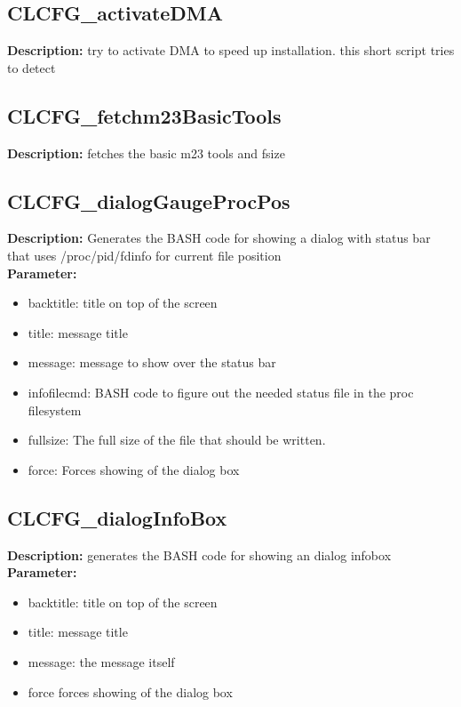 \subsection{CLCFG\_activateDMA}
\textbf{Description:} try to activate DMA to speed up installation. this short script tries to detect\\

\subsection{CLCFG\_fetchm23BasicTools}
\textbf{Description:} fetches the basic m23 tools and fsize\\

\subsection{CLCFG\_dialogGaugeProcPos}
\textbf{Description:} Generates the BASH code for showing a dialog with status bar that uses /proc/pid/fdinfo for current file position\\
\textbf{Parameter:}
\begin{itemize}
\item backtitle: title on top of the screen
\item title: message title
\item message: message to show over the status bar
\item infofilecmd: BASH code to figure out the needed status file in the proc filesystem
\item fullsize: The full size of the file that should be written.
\item force: Forces showing of the dialog box
\end{itemize}

\subsection{CLCFG\_dialogInfoBox}
\textbf{Description:} generates the BASH code for showing an dialog infobox\\
\textbf{Parameter:}
\begin{itemize}
\item backtitle: title on top of the screen
\item title: message title
\item message: the message itself
\item force forces showing of the dialog box
\end{itemize}

